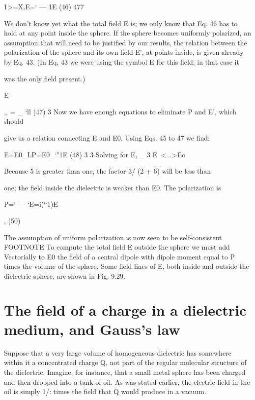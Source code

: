 {\begin{equation}
\end{equation}
1>=X.E=‘ --- 1E (46)
477

We don't know yet what the total field E is; we only know that
Eq. 46 has to hold at any point inside the sphere. If the sphere becomes
uniformly polarized, an assumption that will need to be
justified by our results, the relation between the polarization of the
sphere and its own field E', at points inside, is given already by Eq. 43.
(In Eq. 43 we were using the symbol E for this field; in that case it

was the only field present.)

\begin{equation}
\end{equation}
E{,, = _ ‘ll (47)
3
Now we have enough equations to eliminate P and E', which should

give us a relation connecting E and E0. Using Eqs. 45 to 47 we find:

\begin{equation}
\end{equation}
E=E0_LP=E0_‘"1E (48)
3 3
Solving for E,
_ 3
E~<...>Eo 

Because 5 is greater than one, the factor 3/ (2 + 6) will be less than

one; the field inside the dielectric is weaker than E0. The polarization
is

\begin{equation}
\end{equation}
P=‘ --- ‘E=i(``1)E{, (50)

The assumption of uniform polarization is now seen to be self-consistent
        FOOTNOTE
To compute the total field E outside the sphere we must
add Vectorially to E0 the field of a central dipole with dipole moment
equal to P times the volume of the sphere. Some field lines of E,
both inside and outside the dielectric sphere, are shown in Fig. 9.29.

\section{The field of a charge in a dielectric medium, and Gauss's law}

Suppose that a very large volume of homogeneous dielectric has
somewhere within it a concentrated charge Q, not part of the regular
molecular structure of the dielectric. Imagine, for instance, that a
small metal sphere has been charged and then dropped into a tank
of oil. As was stated earlier, the electric field in the oil is simply 1/:
times the field that Q would produce in a vacuum.

}}}

